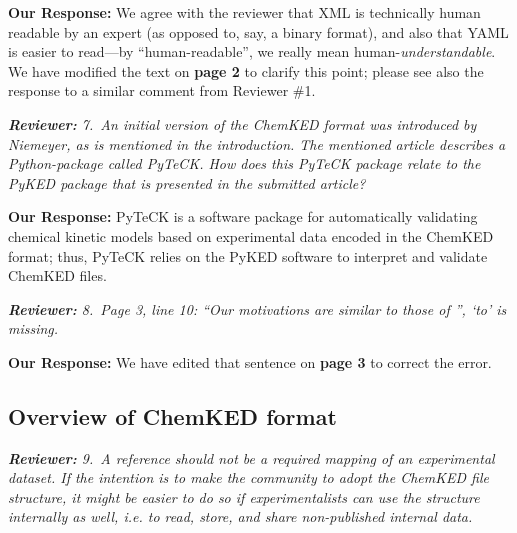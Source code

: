 \documentclass[a4paper,10pt]{elsarticle}
\newenvironment{reviewer}{\vspace{0.5\baselineskip}\begingroup\itshape\textbf{Reviewer:}}{\endgroup}
\newenvironment{response}{\textbf{Our Response:}}{\vspace{0.5\baselineskip}}
\begin{document}
\begin{response}
    We agree with the reviewer that XML is technically human readable by an expert (as opposed to,
    say, a binary format), and also that YAML is easier to read---by ``human-readable'', we really
    mean human-\emph{understandable}. We have modified the text on \textbf{page 2} to clarify this
    point; please see also the response to a similar comment from Reviewer \#1.
\end{response}

\begin{reviewer}
    7.~An initial version of the ChemKED format was introduced by Niemeyer, as is mentioned in the
    introduction. The mentioned article describes a Python-package called PyTeCK. How does this
    PyTeCK package relate to the PyKED package that is presented in the submitted article?
\end{reviewer}

\begin{response}
    PyTeCK is a software package for automatically validating chemical kinetic models based
    on experimental data encoded in the ChemKED format; thus, PyTeCK relies on the PyKED software
    to interpret and validate ChemKED files.
\end{response}

\begin{reviewer}
    8.~Page 3, line 10: ``Our motivations are similar to those of '', `to' is missing.
\end{reviewer}

\begin{response}
    We have edited that sentence on \textbf{page 3} to correct the error.
\end{response}

\subsection*{Overview of ChemKED format}

\begin{reviewer}
    9.~A reference should not be a required mapping of an experimental dataset. If the intention is
    to make the community to adopt the ChemKED file structure, it might be easier to do so if
    experimentalists can use the structure internally as well, i.e. to read, store, and share
    non-published internal data.
\end{reviewer}
\end{document}
